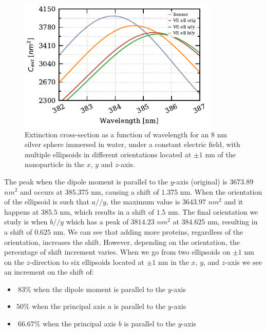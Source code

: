 \begin{figure} %
    \centering
    \includegraphics[width=0.85\textwidth]{six_ve_ell_mult_config.pdf} 
    \caption{Extinction cross-section as a function of wavelength for an $8$ nm
            silver sphere immersed in water, under a constant electric field, with multiple ellipsoids in different orientations 
            located at $\pm 1$ nm of the nanoparticle in the $x$, $y$ and $z$-axis.}
    \label{fig:mult_ell}
 \end{figure}

 The peak when the dipole moment is parallel to the $y$-axis (original) is $3673.89$ $nm^2$ and occurs at $385.375$ nm, causing a shift of 
 $1.375$ nm. When the orientation of the ellipsoid is such that $a//y$, the maximum value is $3643.97$ $nm^2$ and it
 happens at $385.5$ nm, which results in a shift of $1.5$ nm. The final orientation we study is when $b//y$ which 
 has a peak of $3814.23$ $nm^2$ at $384.625$ nm, resulting in a shift of $0.625$ nm. We can see that adding more proteins, 
 regardless of the orientation, increases the shift. However, depending on the orientation, the percentage of shift increment 
 varies. When we go from two ellipsoids on $\pm 1$ nm on the $z$-direction to six ellipsoids located at 
 $\pm 1$ nm in the $x$, $y$, and $z$-axis we see an increment on the shift of:
 
 \begin{itemize}
     \item {$~83\%$ when the dipole moment is parallel to the $y$-axis}
     \item {$50\%$ when the principal axis $a$ is parallel to the $y$-axis}
     \item {$~66.67\%$ when the principal axis $b$ is parallel to the $y$-axis}
 \end{itemize}    


